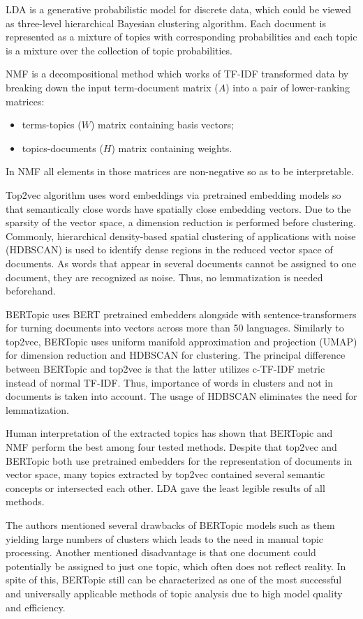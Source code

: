 \documentclass[3p,times,procedia]{elsarticle}
\begin{document}
LDA is a generative probabilistic model for discrete data, which could be viewed as three-level hierarchical Bayesian clustering algorithm. Each document is represented as a mixture of topics with corresponding probabilities and each topic is a mixture over the collection of topic probabilities.

NMF is a decompositional method which works of TF-IDF transformed data by breaking down the input term-document matrix ($A$) into a pair of lower-ranking matrices:
\begin{itemize}
	\item terms-topics ($W$) matrix containing basis vectors;
	\item topics-documents ($H$) matrix containing weights.
\end{itemize}
In NMF all elements in those matrices are non-negative so as to be interpretable.

Top2vec algorithm uses word embeddings via pretrained embedding models so that semantically close words have spatially close embedding vectors. Due to the sparsity of the vector space, a dimension reduction is performed before clustering. Commonly, hierarchical density-based spatial clustering of applications with noise (HDBSCAN) is used to identify dense regions in the reduced vector space of documents. As words that appear in several documents cannot be assigned to one document, they are recognized as noise. Thus, no lemmatization is needed beforehand.

BERTopic uses BERT pretrained embedders alongside with sentence-transformers for turning documents into vectors across more than 50 languages. Similarly to top2vec, BERTopic uses uniform manifold approximation and projection (UMAP) for dimension reduction and HDBSCAN for clustering. The principal difference between BERTopic and top2vec is that the latter utilizes c-TF-IDF metric instead of normal TF-IDF. Thus, importance of words in clusters and not in documents is taken into account. The usage of HDBSCAN eliminates the need for lemmatization.

Human interpretation of the extracted topics has shown that BERTopic and NMF perform the best among four tested methods. Despite that top2vec and BERTopic both use pretrained embedders for the representation of documents in vector space, many topics extracted by top2vec contained several semantic concepts or intersected each other. LDA gave the least legible results of all methods.

The authors mentioned several drawbacks of BERTopic models such as them yielding large numbers of clusters which leads to the need in manual topic processing. Another mentioned disadvantage is that one document could potentially be assigned to just one topic, which often does not reflect reality. In spite of this, BERTopic still can be characterized as one of the most successful and universally applicable methods of topic analysis due to high model quality and efficiency.
\end{document}
